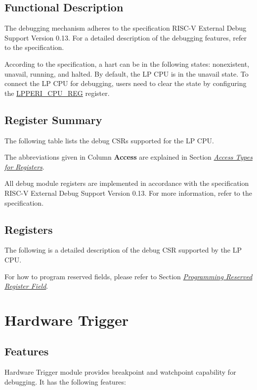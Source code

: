\documentclass[main\_\_EN.tex]{subfiles}
\begin{document}
\subsection{Functional Description}
The debugging mechanism adheres to the specification RISC-V External Debug Support Version 0.13. For a detailed description of the debugging features, refer to the specification.

According to the specification, a hart can be in the following states: nonexistent, unavail, running, and halted. By default, the LP CPU is in the unavail state. To connect the LP CPU for debugging, users need to clear the state by configuring the \hyperref[regdesc:LPPERICPUREG]{LPPERI\_CPU\_REG} register.

\subsection{Register Summary}

The following table lists the debug CSRs supported for the LP CPU.

The abbreviations given in Column \textbf{Access} are explained in Section \hyperref[glossary-access-types]{\textit{Access Types for Registers}}.



All debug module registers are implemented in accordance with the specification RISC-V External Debug Support Version 0.13. For more information, refer to the specification.

\subsection{Registers}
The following is a detailed description of the debug CSR supported by the LP CPU.

For how to program reserved fields, please refer to Section \hyperref[programming-reserved-field]{\textit{Programming Reserved Register Field}}.




\section{Hardware Trigger}\label{sec:ulp-trigger}

\subsection{Features}
Hardware Trigger module provides breakpoint and watchpoint capability for debugging. It has the following features:
\end{document}
